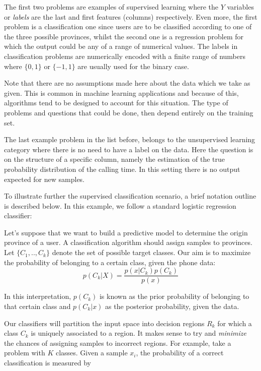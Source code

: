 The first two problems are examples of supervised learning where the $Y$ variables or \textit{labels} are the last and first features (columns) respectively. Even more, the first problem is a classification one since users are to be classified according to one of the three possible provinces, whilst the second one is a regression problem for which the output could be any of a range of numerical values. The labels in classification problems are numerically encoded with a finite range of numbers where $\{0,1\}$ or $\{-1,1\}$ are usually used for the binary case.

Note that there are no assumptions made here about the data which we take as given. %
This is common in machine learning applications and because of this, algorithms tend to be designed to account for this situation. The type of problems and questions that could be done, then depend entirely on the training set.

The last example problem in the list before, belongs to the unsupervised learning category where there is no need to have a label on the data. Here the question is on the structure of a specific column, namely the estimation of the true probability distribution of the calling time. In this setting there is no output expected for new samples.

To illustrate further the supervised classification scenario, a brief notation outline is described below. In this example, we follow a standard logistic regression classifier:


Let's suppose that we want to build a predictive model to determine the origin province of a user. A classification algorithm should assign samples to provinces. Let $\{C_1,..,C_k\}$ denote the set of possible target classes. Our aim is to maximize the probability of belonging to a certain class, given the phone data:
\begin{equation}
p(C_k| X) = \frac{p(x|C_k)p(C_k)}{p(x)} 
\end{equation}

In this interpretation, $p(C_k)$ is known as the prior probability of belonging to that certain class and $p(C_k|x)$ as the posterior probability, given the data.

Our classifiers will partition the input space into decision regions $R_k$ for which a class $C_k$ is uniquely associated to a region. It makes sense to try and \textit{minimize} the chances of assigning samples to incorrect regions. For example, take a problem with $K$ classes. Given a sample $x_i$, the probability of a correct classification is measured by

